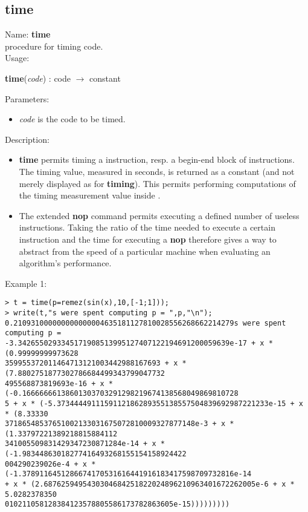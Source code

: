 \subsection{time}
\label{labtime}
\noindent Name: \textbf{time}\\
procedure for timing \sollya code.\\
\noindent Usage: 
\begin{center}
\textbf{time}(\emph{code}) : \textsf{code} $\rightarrow$ \textsf{constant}\\
\end{center}
Parameters: 
\begin{itemize}
\item \emph{code} is the code to be timed.
\end{itemize}
\noindent Description: \begin{itemize}

\item \textbf{time} permits timing a \sollya instruction, resp. a begin-end block
   of \sollya instructions. The timing value, measured in seconds, is returned
   as a \sollya constant (and not merely displayed as for \textbf{timing}). This 
   permits performing computations of the timing measurement value inside \sollya.

\item The extended \textbf{nop} command permits executing a defined number of
   useless instructions. Taking the ratio of the time needed to execute a
   certain \sollya instruction and the time for executing a \textbf{nop}
   therefore gives a way to abstract from the speed of a particular 
   machine when evaluating an algorithm's performance.
\end{itemize}
\noindent Example 1: 
\begin{center}\begin{minipage}{15cm}\begin{Verbatim}[frame=single]
> t = time(p=remez(sin(x),10,[-1;1]));
> write(t,"s were spent computing p = ",p,"\n");
0.210931000000000000004635181127810028556268662214279s were spent computing p = 
-3.3426550293345171908513995127407122194691200059639e-17 + x * (0.99999999973628
359955372011464713121003442988167693 + x * (7.8802751877302786684499343799047732
495568873819693e-16 + x * (-0.16666666138601303703291298219674138568049869810728
5 + x * (-5.3734444911159112186289355138557504839692987221233e-15 + x * (8.33330
37186548537651002133031675072810009327877148e-3 + x * (1.33797221389218815884112
341005509831429347230871284e-14 + x * (-1.98344863018277416493268155154158924422
004290239026e-4 + x * (-1.3789116451286674170531616441916183417598709732816e-14 
+ x * (2.6876259495430304684251822024896210963401672262005e-6 + x * 5.0282378350
010211058128384123578805586173782863605e-15)))))))))
\end{Verbatim}
\end{minipage}\end{center}
